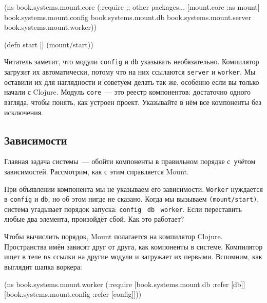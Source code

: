 \begin{english}
  \begin{clojure}
(ns book.systems.mount.core
  (:require
   ;; other packages...
   [mount.core :as mount]
   book.systems.mount.config
   book.systems.mount.db
   book.systems.mount.server
   book.systems.mount.worker))

(defn start []
  (mount/start))
  \end{clojure}
\end{english}

Читатель заметит, что модули \verb|config| и \verb|db| указывать
необязательно. Компилятор загрузит их автоматически, потому что на них ссылаются
\verb|server| и \verb|worker|. Мы оставили их для наглядности и советуем делать так
же, особенно если вы только начали с Clojure. Модуль \verb|core|~--- это реестр
компонентов: достаточно одного взгляда, чтобы понять, как устроен
проект. Указывайте в нём все компоненты без исключения.

\subsection{Зависимости}


Главная задача системы~--- обойти компоненты в правильном порядке с~учётом
зависимостей. Рассмотрим, как с этим справляется Mount.

При объявлении компонента мы не указываем его зависимости. \verb|Worker|
нуждается в \verb|config| и \verb|db|, но об этом нигде не сказано. Когда мы
вызываем \verb|(mount/start)|, система угадывает порядок запуска:
\verb|config|~\arr{} \verb|db|~\arr{} \verb|worker|. Если переставить любые два
элемента, произойдёт сбой. Как это работает?

Чтобы вычислить порядок, Mount полагается на компилятор Clojure. Пространства
имён зависят друг от друга, как компоненты в системе. Компилятор ищет в теле
\verb|ns| ссылки на другие модули и загружает их первыми. Вспомним, как
выглядит шапка воркера:

\begin{english}
  \begin{clojure}
(ns book.systems.mount.worker
  (:require
   [book.systems.mount.db :refer [db]]
   [book.systems.mount.config
     :refer [config]]))
  \end{clojure}
\end{english}


